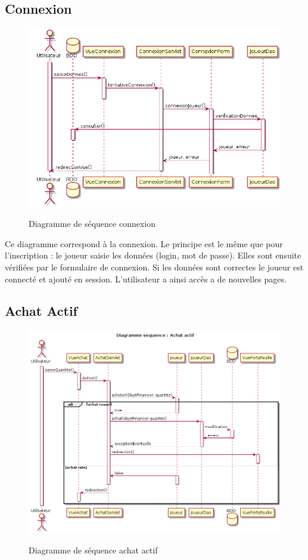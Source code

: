 \subsection{Connexion}
\begin{figure}[H]
  \center
  \includegraphics[scale=0.25]{../graph/DiagrammeSequenceConnexion.png} \\
  \caption{Diagramme de séquence connexion}
\end{figure}

Ce diagramme correspond à la connexion. Le principe est le même que pour l'inscription : le joueur saisie les données (login, mot de passe). Elles sont ensuite vérifiées par le formulaire de connexion. Si les données sont correctes le joueur est connecté et ajouté en session. L'utilisateur a ainsi accès a de nouvelles pages.

\subsection{Achat Actif}
\begin{figure}[H]
  \center
  \includegraphics[scale=0.25]{../graph/DiagrammeSequenceAchatActif.png} \\
  \caption{Diagramme de séquence achat actif}
\end{figure}

